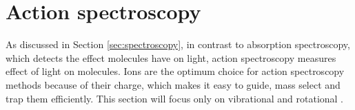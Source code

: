 \section{Action spectroscopy}
\label{sec:action-spectroscopy}

As discussed in Section \ref{sec:spectroscopy}, in contrast to absorption
spectroscopy, which detects the effect molecules have on light, action
spectroscopy measures effect of light on molecules. Ions are the optimum choice
for action spectroscopy methods because of their charge, which makes it easy to
guide, mass select and trap them efficiently. This section will focus only on
vibrational and rotational .


